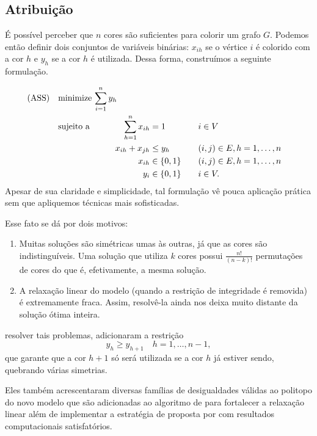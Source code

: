 \documentclass[11pt]{article}
\providecommand{\DIFaddtex}[1]{{\protect\color{blue}{#1}}} %
\providecommand{\DIFaddbegin}{} %
\providecommand{\DIFaddend}{} %
\providecommand{\DIFadd}[1]{\texorpdfstring{\DIFaddtex{#1}}{#1}} %
\newcommand{\DIFaddincludegraphics}[2][]{{\color{blue}\fbox{\DIFOincludegraphics[#1]{#2}}}} %
\DeclareRobustCommand{\DIFaddbegin}{\DIFOaddbegin \let\includegraphics\DIFaddincludegraphics} %
\DeclareRobustCommand{\DIFaddend}{\DIFOaddend \let\includegraphics\DIFOincludegraphics} %
\begin{document}
\subsection{Atribuição}
 \DIFaddbegin \label{sec:org104c1cf}
\DIFaddend É possível perceber que \(n\) cores são suficientes para colorir um grafo \(G\). Podemos então definir dois conjuntos de variáveis binárias: \(x_{ih}\) se o vértice \(i\) é colorido com a cor \(h\) e \(y_h\) se a cor \(h\) é utilizada. Dessa forma, construímos a seguinte formulação.

\begin{alignat*}{4}
\label{ass}
\mathrm{(ASS)} \quad & \omit\rlap{minimize  $\displaystyle \sum_{i=1}^n y_h$} \\
& \mbox{sujeito a}&& \quad & \sum_{h=1}^n x_{ih}&= 1        & \quad & i \in V \\
&                 &&   & x_{ih} + x_{jh}    & \leq y_h &   & (i,j) \in E, h=1,\dots,n \\
&                 &&   & x_{ih}    & \in \{0,1\} &   & (i,j) \in E, h=1,\dots,n\\
&                 &&   & y_i       & \in \{0,1\} &   & i \in V.
\end{alignat*}
Apesar de sua claridade e simplicidade, tal formulação vê pouca aplicação prática sem que apliquemos técnicas mais sofisticadas.

Esse fato se dá por dois motivos:
\begin{enumerate}
\item Muitas soluções são simétricas umas às outras, já que as cores são indistinguíveis. Uma solução que utiliza \(k\) cores possui \(\frac{n!}{(n-k)!}\) permutações de cores do que é, efetivamente, a mesma solução.
\item A relaxação linear do modelo (quando a restrição de integridade é removida) é extremamente fraca. Assim, resolvê-la ainda nos deixa muito distante da solução ótima inteira.
\end{enumerate}

 \DIFaddbegin \DIFadd{De modo a }\DIFaddend resolver tais problemas, \textcite{MendezDiaz2006BranchCutAlgorithm} adicionaram a restrição
\[ y_h \geq y_{h+1} \quad h = 1, \dots, n-1, \]
que garante que a cor \(h+1\) só será utilizada se a cor \(h\) já estiver sendo, quebrando várias simetrias.

Eles também acrescentaram diversas famílias de desigualdades válidas ao politopo do novo modelo que são adicionadas ao algoritmo de \emph{\DIFaddbegin\DIFadd{branch-and-cut}\DIFaddend } para fortalecer a relaxação linear além de implementar a estratégia de  \DIFaddbegin \DIFadd{ramificação }\DIFaddend proposta por \textcite{Brelaz1979Newmethodscolor} com resultados computacionais satisfatórios.
\end{document}
